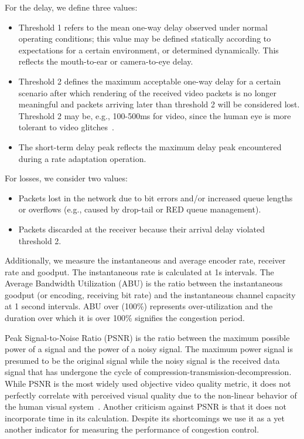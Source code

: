 For the delay, we define three values:

\begin{itemize}
\setlength{\itemsep}{0pt}

\item Threshold 1 refers to the mean one-way delay observed under normal
operating conditions; this value may be defined statically according to
expectations for a certain environment, or determined dynamically. This
reflects the mouth-to-ear or camera-to-eye delay.

\item Threshold 2 defines the maximum acceptable one-way delay for a certain
scenario after which rendering of the received video packets is no longer
meaningful and packets arriving later than threshold 2 will be considered
lost. Threshold 2 may be, e.g., 100-500ms for video, since the human eye is
more tolerant to video glitches~\cite{s4.eval.fw}.

\item The short-term delay peak reflects the maximum delay peak encountered
during a rate adaptation operation.

\end{itemize}

For losses, we consider two values:

\begin{itemize}
\setlength{\itemsep}{0pt}

\item Packets lost in the network due to bit errors and/or increased queue
lengths or overflows (e.g., caused by drop-tail or RED queue management).

\item Packets discarded at the receiver because their arrival delay violated
threshold 2.

\end{itemize}

Additionally, we measure the instantaneous and average encoder rate, receiver
rate and goodput. The instantaneous rate is calculated at 1s intervals. The
Average Bandwidth Utilization (ABU) is the ratio between the instantaneous
goodput (or encoding, receiving bit rate) and the instantaneous channel
capacity at 1 second intervals. ABU over (100\%) represents over-utilization
and the duration over which it is over 100\% signifies the congestion period.


Peak Signal-to-Noise Ratio (PSNR) is the ratio between the maximum possible
power of a signal and the power of a noisy signal. The maximum power signal is
presumed to be the original signal while the noisy signal is the received data
signal that has undergone the cycle of compression-transmission-decompression.
While PSNR is the most widely used objective video quality metric, it does not
perfectly correlate with perceived visual quality due to the non-linear
behavior of the human visual system~\cite{itu-t-j247}. Another criticism
against PSNR is that it does not incorporate time in its calculation. Despite
its shortcomings we use it as a yet another indicator for measuring the
performance of congestion control.

